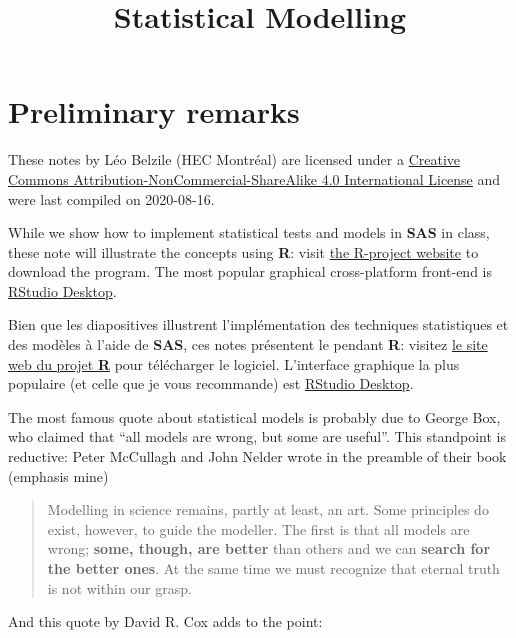 \documentclass[
  11pt,
  letterpaper,
]{book}
\title{Statistical Modelling}
\author{}
\date{\vspace{-2.5em}}
\let\oldhref\href
\renewcommand{\href}[2]{#2\footnote{\url{#1}}}
\theoremstyle{definition}
\theoremstyle{definition}
\theoremstyle{definition}
\theoremstyle{remark}
\begin{document}
\maketitle

\let\href\oldhref

{
\setcounter{tocdepth}{1}
\tableofcontents
}
\hypertarget{preliminary-remarks}{%
\chapter*{Preliminary remarks}\label{preliminary-remarks}}

These notes by Léo Belzile (HEC Montréal) are licensed under a \href{http://creativecommons.org/licenses/by-nc-sa/4.0/}{Creative Commons Attribution-NonCommercial-ShareAlike 4.0 International License} and were last compiled on 2020-08-16.

While we show how to implement statistical tests and models in \textbf{SAS} in class, these note will illustrate the concepts using \textbf{R}: visit \href{https://cran.r-project.org/}{the R-project website} to download the program. The most popular graphical cross-platform front-end is \href{https://www.rstudio.com/products/rstudio/download/}{RStudio Desktop}.

Bien que les diapositives illustrent l'implémentation des techniques statistiques et des modèles à l'aide de \textbf{SAS}, ces notes présentent le pendant \textbf{R}: visitez \href{https://cran.r-project.org/}{le site web du projet \textbf{R}} pour télécharger le logiciel. L'interface graphique la plus populaire (et celle que je vous recommande) est \href{https://www.rstudio.com/products/rstudio/download/}{RStudio Desktop}.

The most famous quote about statistical models is probably due to George Box, who claimed that ``all models are wrong, but some are useful''. This standpoint is reductive: Peter McCullagh and John Nelder wrote in the preamble of their book (emphasis mine)

\begin{quote}
Modelling in science remains, partly at least, an art. Some principles do exist, however, to guide the modeller. The first is that all models are wrong; \textbf{some, though, are better} than others and we can \textbf{search for the better ones}. At the same time we must recognize that eternal truth is not within our grasp.
\end{quote}

And this quote by David R. Cox adds to the point:
\end{document}
